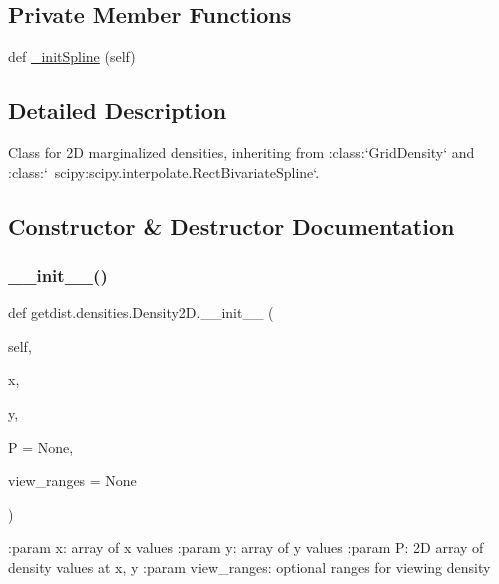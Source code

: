 \subsection*{Private Member Functions}
\begin{DoxyCompactItemize}
\item 
def \mbox{\hyperlink{classgetdist_1_1densities_1_1Density2D_abe44d1daf83c674e7b584acb50acdc58}{\+\_\+init\+Spline}} (self)
\end{DoxyCompactItemize}


\subsection{Detailed Description}
\begin{DoxyVerb}Class for 2D marginalized densities, inheriting from :class:`GridDensity` and :class:`~scipy:scipy.interpolate.RectBivariateSpline`.
\end{DoxyVerb}
 

\subsection{Constructor \& Destructor Documentation}
\mbox{\label{classgetdist_1_1densities_1_1Density2D_ac12a300460a076fedffa0d8137fb2ba7}} 
\subsubsection{\texorpdfstring{\+\_\+\+\_\+init\+\_\+\+\_\+()}{\_\_init\_\_()}}
{\footnotesize\ttfamily def getdist.\+densities.\+Density2\+D.\+\_\+\+\_\+init\+\_\+\+\_\+ (\begin{DoxyParamCaption}\item[{}]{self,  }\item[{}]{x,  }\item[{}]{y,  }\item[{}]{P = {\ttfamily None},  }\item[{}]{view\+\_\+ranges = {\ttfamily None} }\end{DoxyParamCaption})}

\begin{DoxyVerb}:param x: array of x values
:param y: array of y values
:param P: 2D array of density values at x, y
:param view_ranges: optional ranges for viewing density
\end{DoxyVerb}
 

